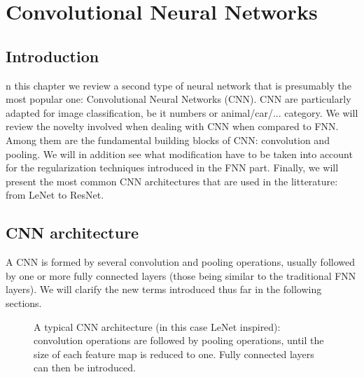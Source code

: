\chapter{Convolutional Neural Networks} \label{sec:chapterCNN}

\minitoc

\section{Introduction}

n this chapter we review a second type of neural network that is presumably the most popular one: Convolutional Neural Networks (CNN). CNN are particularly adapted for image classification, be it numbers or animal/car/... category. We will review the novelty involved when dealing with CNN when compared to FNN. Among them are the fundamental building blocks of CNN: convolution and pooling. We will in addition see what modification have to be taken into account for the regularization techniques introduced in the FNN part. Finally, we will present the most common CNN architectures that are used in the litterature: from LeNet to ResNet.


\section{CNN architecture}


A CNN is formed by several convolution and pooling operations, usually followed by one or more fully connected layers (those being similar to the traditional FNN layers). We will clarify the new terms introduced thus far in the following sections.


\begin{figure}[H]
\begin{center}
\caption{\label{fig:lenet-CNN}A typical CNN architecture (in this case LeNet inspired): convolution operations are followed by pooling operations, until the size of each feature map is reduced to one. Fully connected layers can then be introduced.}
\end{center}
\end{figure}

